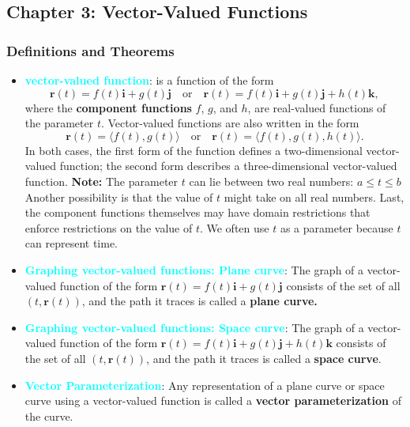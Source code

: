 \documentclass{report}
\begin{document}
    \subsection{Chapter 3: Vector-Valued Functions}
    \bigbreak \noindent 
    \subsubsection{Definitions and Theorems}
    \begin{itemize}
        \item \textbf{\textcolor{cyan}{vector-valued function}}: is a function of the form
            \[
                \mathbf{r}(t) = f(t)\mathbf{i} + g(t)\mathbf{j} \quad \text{or} \quad \mathbf{r}(t) = f(t)\mathbf{i} + g(t)\mathbf{j} + h(t)\mathbf{k},
            \]
            where the \textbf{component functions} $f$, $g$, and $h$, are real-valued functions of the parameter $t$. Vector-valued functions are also written in the form
            \[
                \mathbf{r}(t) = \langle f(t), g(t) \rangle \quad \text{or} \quad \mathbf{r}(t) = \langle f(t), g(t), h(t) \rangle.
            \]
            In both cases, the first form of the function defines a two-dimensional vector-valued function; the second form describes a three-dimensional vector-valued function.
            \bigbreak \noindent 
            \textbf{Note:} The parameter $t$ can lie between two real numbers: $a \leq t \leq b$ Another possibility is that the value of $t$ might take on all real numbers. Last, the component functions themselves may have domain restrictions that enforce restrictions on the value of $t$. We often use $t$ as a parameter because $t$ can represent time.
        \item \textbf{\textcolor{cyan}{Graphing vector-valued functions: Plane curve}}:
            The graph of a vector-valued function of the form \( \mathbf{r}(t) = f(t)\mathbf{i} + g(t)\mathbf{j} \) consists of the set of all \( (t, \mathbf{r}(t)) \), and the path it traces is called a \textbf{plane curve.}
        \item \textbf{\textcolor{cyan}{Graphing vector-valued functions: Space curve}}:
            The graph of a vector-valued function of the form \( \mathbf{r}(t) = f(t)\mathbf{i} + g(t)\mathbf{j} + h(t)\mathbf{k} \) consists of the set of all \( (t, \mathbf{r}(t)) \), and the path it traces is called a \textbf{space curve}.
        \item \textbf{\textcolor{cyan}{Vector Parameterization}}: 
            Any representation of a plane curve or space curve using a vector-valued function is called a \textbf{vector parameterization} of the curve.

\end{itemize}
\end{document}
